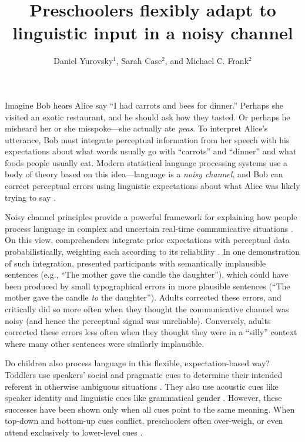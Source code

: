\documentclass[man,floatsintext]{apa6}
\title{Preschoolers flexibly adapt to linguistic input in a noisy channel}
\author{Daniel Yurovsky$^1$, Sarah Case$^2$, and Michael C. Frank$^2$}
\affiliation{$^1$Department of Psychology, University of Chicago\\
    $^2$Department of Psychology, Stanford University}
\begin{document}
\maketitle

Imagine Bob hears Alice say ``I had carrots and bees for dinner.'' Perhaps she visited an exotic restaurant, and he should ask how they tasted. Or perhaps he misheard her or she misspoke---she actually ate \emph{peas}. To interpret Alice's utterance, Bob must integrate perceptual information from her speech with his expectations about what words usually go with ``carrots'' and ``dinner'' and what foods people usually eat. Modern statistical language processing systems use a body of theory based on this idea---language is a \emph{noisy channel}, and Bob can correct perceptual errors using linguistic expectations about what Alice was likely trying to say \cite{jelinek1976, shannon1948}.

Noisy channel principles provide a powerful framework for explaining how people process language in complex and uncertain real-time communicative situations \cite{clayards2008, levy2008, jaeger2010}. On this view, comprehenders integrate prior expectations with perceptual data probabilistically, weighting each according to its reliability \cite{ernst2002, jacobs1999}. In one demonstration of such integration,  presented participants with semantically implausible sentences (e.g., ``The mother gave the candle the daughter''), which could have been produced by small typographical errors in more plausible sentences (``The mother gave the candle \emph{to} the daughter''). Adults corrected these errors, and critically did so more often when they thought the communicative channel was noisy (and hence the perceptual signal was unreliable). Conversely, adults corrected these errors less often when they thought they were in a ``silly'' context where many other sentences were similarly implausible.

Do children also process language in this flexible, expectation-based way? Toddlers use speakers' social and pragmatic cues to determine their intended referent in otherwise ambiguous situations \cite{carpenter1998, clark2009}. They also use acoustic cues like speaker identity and linguistic cues like grammatical gender \cite{lew-williams2007, creel2012}. However, these successes have been shown only when all cues point to the same meaning. When top-down and bottom-up cues conflict, preschoolers often over-weigh, or even attend exclusively to lower-level cues \cite{trueswell1999,snedeker2004}.
\end{document}
